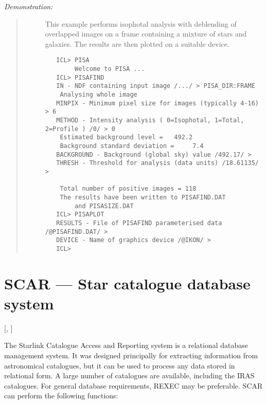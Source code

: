 {\em Demonstration:}\hfill
\begin{quote}
\begin{description}
\item [] This example performs isophotal analysis with deblending of overlapped
images on a frame containing a mixture of stars and galaxies.
The results are then plotted on a suitable device.

\begin{small}
\begin{verbatim}
   ICL> PISA
        Welcome to PISA ...
   ICL> PISAFIND
   IN - NDF containing input image /.../ > PISA_DIR:FRAME
    Analysing whole image
   MINPIX - Minimum pixel size for images (typically 4-16) > 6
   METHOD - Intensity analysis ( 0=Isophotal, 1=Total, 2=Profile ) /0/ > 0
    Estimated background level =   492.2
    Background standard deviation =     7.4
   BACKGROUND - Background (global sky) value /492.17/ >
   THRESH - Threshold for analysis (data units) /18.61135/ >

    Total number of positive images = 118
    The results have been written to PISAFIND.DAT
        and PISASIZE.DAT
   ICL> PISAPLOT
   RESULTS - File of PISAFIND parameterised data /@PISAFIND.DAT/ >
   DEVICE - Name of graphics device /@IKON/ >
   ICL>
\end{verbatim}
\end{small}

\end{description}
\end{quote}

\newpage

\section{SCAR --- Star catalogue database system} 

\vspace{-11mm}

\hfill [, ]

\vspace{5mm}

The Starlink Catalogue Access and Reporting system is a relational database
management system.
It was designed principally for extracting information from astronomical
catalogues, but it can be used to process any data stored in relational form.
A large number of catalogues are available, including the IRAS catalogues.
For general database requirements, REXEC may be preferable.
SCAR can perform the following functions:

